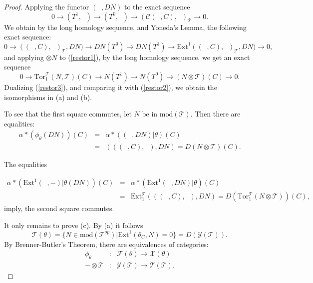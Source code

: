 \documentclass{amsart}
\theoremstyle{plain}
\numberwithin{equation}{section}
\begin{document}
\begin{proof}
Applying the functor $(\;\;,DN)$ to the exact sequence
\begin{equation}
0\rightarrow (T^{1},\;\;)\rightarrow (T^{0},\;\;)\rightarrow (\mathcal{C}(\;\;,C),\;\;)_{\mathcal{T}}\rightarrow 0\text{.}  \label{restor1}
\end{equation}We obtain by the long homology sequence, and Yoneda's Lemma, the following
exact sequence:
\begin{equation}
0\rightarrow ((\;\;,C),\;\;)_{\mathcal{T}},DN)\rightarrow
DN(T^{0})\rightarrow DN(T^{1})\rightarrow \mathrm{Ext}^{1}((\;\;,C),\;\;)_{\mathcal{T}},DN)\rightarrow 0\text{,}  \label{restor2}
\end{equation}and applying $\otimes N$ to (\ref{restor1}), by the long homology sequence,
we get an exact sequence
\begin{equation}
0\rightarrow \mathrm{Tor}_{1}^{\mathcal{T}}(N,\mathcal{T})(C)\rightarrow
N(T^{1})\rightarrow N(T^{0})\rightarrow (N\otimes \mathcal{T})(C)\rightarrow
0\text{.}  \label{restor3}
\end{equation}Dualizing (\ref{restor3}), and comparing it with (\ref{restor2}), we obtain
the isomorphisms in (a) and (b).

To see that the first square commutes, let $N$ be in $\mathrm{mod}(\mathcal{T})$. Then there are equalities:
\begin{eqnarray*}
\alpha \ast (\phi _{\theta }(DN))(C) &=&\alpha \ast ((\;\;,DN)|\theta )(C) \\
&=&(((\;\;,C),\;\;),DN)=D(N\otimes \mathcal{T})(C)\text{.}
\end{eqnarray*}

The equalities

\begin{eqnarray*}
\alpha \ast (\mathrm{Ext}^{1}(\;\;,-)|\theta (DN))(C) &=&\alpha \ast (\mathrm{Ext}^{1}(\;\;,DN)|\theta )(C) \\
&=&\mathrm{Ext}_{1}^{\mathcal{T}}(((\;\;,C),\;\;),DN)=D(\mathrm{Tor}_{1}^{\mathcal{T}}(N\otimes \mathcal{T}))(C)\text{,}
\end{eqnarray*}imply, the second square commutes.

It only remains to prove (c). By (a) it follows
\begin{equation*}
\mathscr{T}(\theta )=\{N\in \mathrm{mod}(\mathcal{T}^{op})|\mathrm{Ext}^{1}(\theta _{C},N)=0\}=D(\mathscr{Y}(\mathcal{T})).
\end{equation*}By Brenner-Butler's Theorem, there are equivalences of categories:
\begin{eqnarray*}
\phi _{\theta } &:&\mathscr F(\theta )\rightarrow \mathscr{X}(\theta ) \\
-\otimes \mathcal{T} &:&\mathscr Y(\mathcal{T})\rightarrow \mathscr{T}(\mathcal{T})\text{.}
\end{eqnarray*}


\end{proof}
\end{document}
